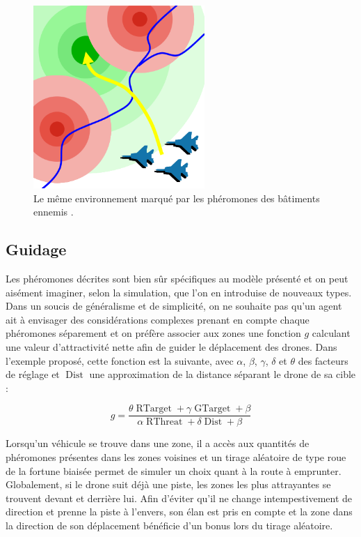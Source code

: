 \documentclass[12pt]{article}
\begin{document}
\begin{figure}[H]
  \centering

  \includegraphics[width=6.5cm]{terrain_field.png}

  \caption{Le même environnement marqué par les phéromones des
    bâtiments ennemis \cite{parunak}.}
  \label{field}
\end{figure}

\subsection{Guidage}

Les phéromones décrites sont bien sûr spécifiques au modèle présenté
et on peut aisément imaginer, selon la simulation, que l'on en
introduise de nouveaux types. Dans un soucis de généralisme et de
simplicité, on ne souhaite pas qu'un agent ait à envisager des
considérations complexes prenant en compte chaque phéromones
séparement et on préfère associer aux zones une fonction $g$ calculant
une valeur d'attractivité nette afin de guider le déplacement des
drones. Dans l'exemple proposé, cette fonction est la suivante, avec
$\alpha$, $\beta$, $\gamma$, $\delta$ et $\theta$ des facteurs de
réglage et $\operatorname{Dist}$ une approximation de la distance
séparant le drone de sa cible :

\begin{equation}
  g = \frac{ \theta \operatorname{RTarget} + \gamma
  \operatorname{GTarget} + \beta}{\alpha \operatorname{RThreat} + \delta
  \operatorname{Dist} + \beta}
  \label{g}
\end{equation}

Lorsqu'un véhicule se trouve dans une zone, il a accès aux quantités
de phéromones présentes dans les zones voisines et un tirage aléatoire
de type roue de la fortune biaisée permet de simuler un choix quant à
la route à emprunter. Globalement, si le drone suit déjà une piste, les
zones les plus attrayantes se trouvent devant et derrière lui. Afin
d'éviter qu'il ne change intempestivement de direction et prenne la piste à l'envers, son élan est pris en
compte et la zone dans la direction de son déplacement bénéficie d'un bonus lors du tirage
aléatoire.
\end{document}
